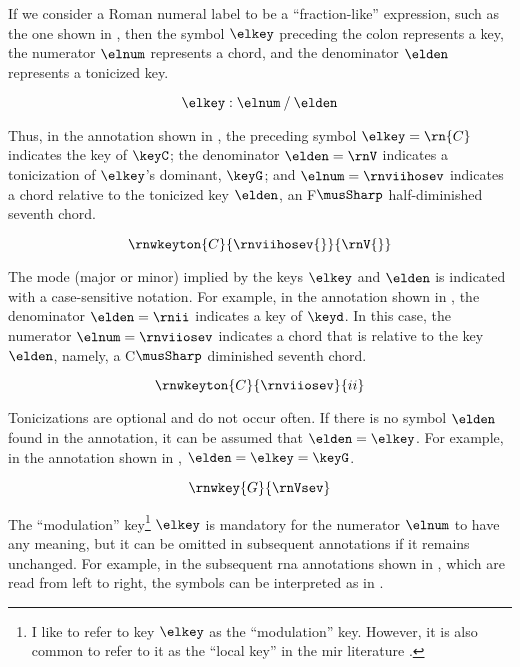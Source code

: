 
If we consider a Roman numeral label to be a
``fraction-like'' expression, such as the one shown in
, then the symbol $\elkey$ preceding
the colon represents a key, the numerator $\elnum$
represents a chord, and the denominator $\elden$ represents
a tonicized key.

\begin{equation}
    \label{eq:rn_expression}
    \elkey : \elnum \: / \: \elden
\end{equation}

Thus, in the annotation shown in , the
preceding symbol $\elkey=\rn{C}$ indicates the key of
$\keyC$; the denominator $\elden = \rnV$ indicates a
tonicization of $\elkey$'s dominant, $\keyG$; and
$\elnum=\rnviihosev$ indicates a chord relative to the
tonicized key $\elden$, an F$\musSharp$ half-diminished
seventh chord.

\begin{equation}
    \label{eq:rn_example1}
    \rnwkeyton{C}{\rnviihosev{}}{\rnV{}}
\end{equation}


The mode (major or minor) implied by the keys $\elkey$ and
$\elden$ is indicated with a case-sensitive notation. For
example, in the annotation shown in , the
denominator $\elden=\rnii$ indicates a key of $\keyd$. In
this case, the numerator $\elnum = \rnviiosev$ indicates a
chord that is relative to the key $\elden$, namely, a
C$\musSharp$ diminished seventh chord.

\begin{equation}
    \label{eq:rn_example2}
    \rnwkeyton{C}{\rnviiosev}{ii}
\end{equation}

Tonicizations are optional and do not occur often. If there
is no symbol $\elden$ found in the annotation, it can be
assumed that $\elden = \elkey$. For example, in the
annotation shown in , $\elden = \elkey =
\keyG$.

\begin{equation}
    \label{eq:rn_example3}
    \rnwkey{G}{\rnVsev}
\end{equation}

The ``modulation'' key\footnote{I like to refer to key
$\elkey$ as the ``modulation'' key. However, it is also
common to refer to it as the ``local key'' in the \gls{mir}
literature \parencite{napoleslopez2020local}.} $\elkey$ is
mandatory for the numerator $\elnum$ to have any meaning,
but it can be omitted in subsequent annotations if it
remains unchanged. For example, in the subsequent \gls{rna}
annotations shown in , which are
read from left to right, the symbols can be interpreted as
in .

